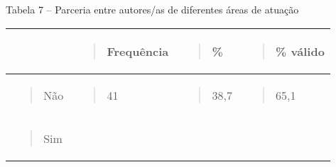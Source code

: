 Tabela 7 -- Parceria entre autores/as de diferentes áreas de atuação

\begin{longtable}[]{@{}llll@{}}
\toprule
\begin{minipage}[b]{0.24\columnwidth}\raggedright\strut
\strut
\end{minipage} & \begin{minipage}[b]{0.24\columnwidth}\raggedright\strut
\begin{quote}
Frequência
\end{quote}\strut
\end{minipage} & \begin{minipage}[b]{0.24\columnwidth}\raggedright\strut
\begin{quote}
\%
\end{quote}\strut
\end{minipage} & \begin{minipage}[b]{0.24\columnwidth}\raggedright\strut
\begin{quote}
\% válido
\end{quote}\strut
\end{minipage}\tabularnewline
\midrule
\endhead
\begin{minipage}[t]{0.24\columnwidth}\raggedright\strut
\begin{quote}
Não
\end{quote}\strut
\end{minipage} & \begin{minipage}[t]{0.24\columnwidth}\raggedright\strut
\begin{quote}
41
\end{quote}\strut
\end{minipage} & \begin{minipage}[t]{0.24\columnwidth}\raggedright\strut
\begin{quote}
38,7
\end{quote}\strut
\end{minipage} & \begin{minipage}[t]{0.24\columnwidth}\raggedright\strut
\begin{quote}
65,1
\end{quote}\strut
\end{minipage}\tabularnewline
\begin{minipage}[t]{0.24\columnwidth}\raggedright\strut
\begin{quote}
Sim
\end{quote}\strut
\end{minipage} & \begin{minipage}[t]{0.24\columnwidth}\raggedright\strut

\end{minipage}
\end{longtable}
